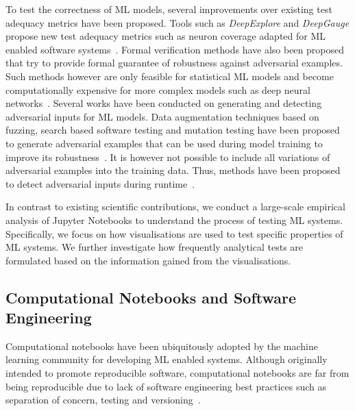 To test the correctness of ML models, several improvements over
existing test adequacy metrics have been proposed. Tools such as
\textit{DeepExplore} and \textit{DeepGauge} propose new test adequacy
metrics such as neuron coverage adapted for ML enabled software
systems~\cite{pei2017deepexplore, ma2018deepgauge,
  gerasimou2020importance}. Formal verification methods have also been
proposed that try to provide formal guarantee of robustness against
adversarial examples. Such methods however are only feasible for
statistical ML models and become computationally expensive for more
complex models such as deep neural networks~\cite{zhu2021deepmemory,
  baluta2021scalable}. Several works have been conducted on generating
and detecting adversarial inputs for ML models. Data augmentation
techniques based on fuzzing, search based software testing and
mutation testing have been proposed to generate adversarial examples
that can be used during model training to improve its
robustness~\cite{braiek2019deepevolution, gao2020fuzz, wang2021robot,
  zhang2020white}. It is however not possible to include all
variations of adversarial examples into the training data. Thus,
methods have been proposed to detect adversarial inputs during
runtime~\cite{xiao2021self, wang2020dissector, wang2019adversarial,
  berend2020cats}.

In contrast to existing scientific contributions, we conduct a
large-scale empirical analysis of Jupyter Notebooks to understand the
process of testing ML systems. Specifically, we focus on how
visualisations are used to test specific properties of ML systems. We
further investigate how frequently analytical tests are formulated
based on the information gained from the visualisations.

\subsection{Computational Notebooks and Software Engineering}\label{sec:notebooks}

Computational notebooks have been ubiquitously adopted by the machine
learning community for developing ML enabled systems. Although
originally intended to promote reproducible software, computational
notebooks are far from being reproducible due to lack of software
engineering best practices such as separation of concern, testing and
versioning~\cite{pimentel2019large,wang2020better,chattopadhyay2020wrong}.

